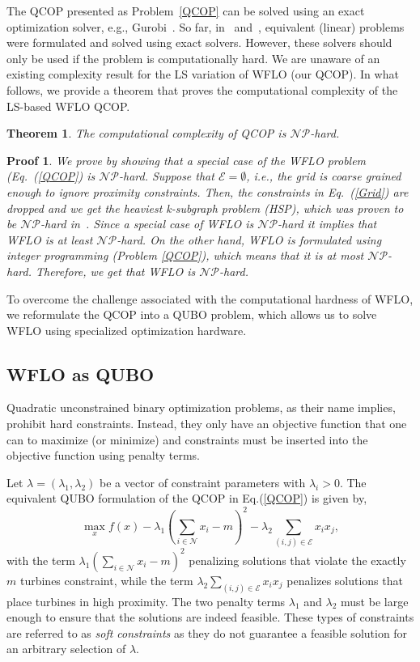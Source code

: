 \documentclass[preprint,12pt]{elsarticle}
\newtheorem{mythm}{Theorem}
\newtheorem{myproof}{Proof}
\begin{document}
The QCOP presented as Problem~\ref{QCOP} can be solved using an exact optimization solver, e.g., Gurobi~\cite{gurobi}. 
So far, in~\cite{Zhang2014} and~\cite{donovan2005wind}, equivalent (linear) problems were formulated and solved using 
exact solvers. However, these solvers should only be used if the problem is computationally hard.
We are unaware of an existing complexity result for the LS variation of WFLO (our QCOP). In what follows, we provide
a theorem that proves the computational complexity of the LS-based WFLO QCOP. 
\begin{mythm}
	The computational complexity of QCOP is $\mathcal{NP}$-hard. 
\end{mythm}
\begin{myproof}
We prove by showing that a special case of the WFLO problem (Eq.~(\ref{QCOP}) is
$\mathcal{NP}$-hard. Suppose that $\mathcal{E} = \emptyset$, i.e., the grid is coarse grained enough to ignore proximity constraints. Then, the constraints in Eq.~(\ref{Grid})
are dropped and we get the heaviest k-subgraph problem (HSP), which was proven to be $\mathcal{NP}$-hard in~\cite{billionnet2005different}.
Since a special case of WFLO is  $\mathcal{NP}$-hard it implies that WFLO is at least $\mathcal{NP}$-hard. On the other hand,
WFLO is formulated using integer programming (Problem \ref{QCOP}), which means that it is at most $\mathcal{NP}$-hard. Therefore, we get that WFLO is $\mathcal{NP}$-hard.
	\end{myproof} To overcome the challenge associated with the computational hardness of WFLO,
we reformulate the QCOP into a QUBO problem, which allows us to solve WFLO using specialized optimization hardware.  


\subsection{WFLO as QUBO}

Quadratic unconstrained binary optimization problems, as their name implies, prohibit hard constraints. Instead, 
they only 
have an objective function that 
one can to maximize (or minimize) and constraints must be inserted into the objective function
using penalty terms. 

Let $\lambda = (\lambda_1,\lambda_2)$ 
be a vector of constraint parameters with $\lambda_i >0$. The equivalent QUBO formulation of the QCOP in Eq.(\ref{QCOP}) is given by,
\begin{equation}\max_{x}^{} f(x) - \lambda_1 (\sum_{i \in \mathcal{N}}^{} x_i -m) ^2 - \lambda_2 \sum_{(i,j) \in \mathcal{E}}^{} x_i x_j , \label{QUBO}\end{equation}
with the term $ \lambda_1 (\sum_{i \in \mathcal{N}}^{} x_i -m) ^2$ 
penalizing solutions that violate the exactly $m$ turbines constraint, while the term $\lambda_2 \sum_{(i,j) \in \mathcal{E}}^{} x_i x_j$ penalizes
solutions that place turbines in high proximity. The two penalty terms $\lambda_1$ and $\lambda_2$ 
must be large enough to ensure that the solutions are indeed feasible. These types of constraints
are referred to as \emph{soft constraints} as they do not guarantee a feasible solution 
for an arbitrary selection of $\lambda$.   
\end{document}
